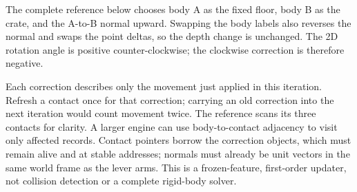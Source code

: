 The complete reference below chooses body A as the fixed floor, body B as the crate, and the A-to-B normal upward. Swapping the body labels also reverses the normal and swaps the point deltas, so the depth change is unchanged. The 2D rotation angle is positive counter-clockwise; the clockwise correction is therefore negative.

Each correction describes only the movement just applied in this iteration. Refresh a contact once for that correction; carrying an old correction into the next iteration would count movement twice. The reference scans its three contacts for clarity. A larger engine can use body-to-contact adjacency to visit only affected records. Contact pointers borrow the correction objects, which must remain alive and at stable addresses; normals must already be unit vectors in the same world frame as the lever arms. This is a frozen-feature, first-order updater, not collision detection or a complete rigid-body solver.

